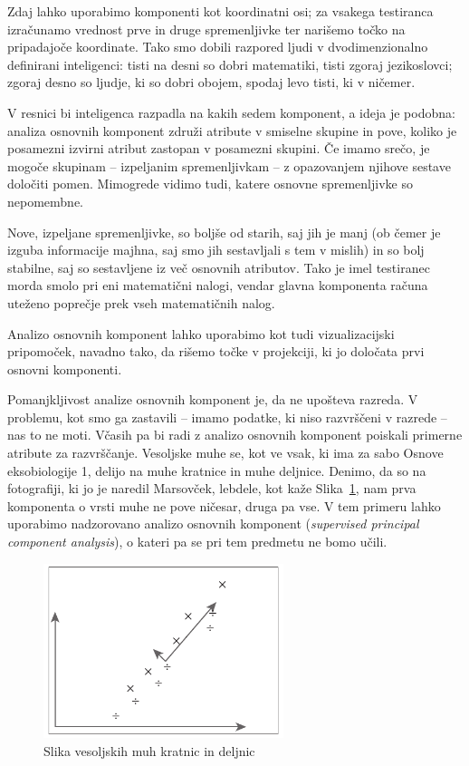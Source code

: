 Zdaj lahko uporabimo komponenti kot koordinatni osi; za vsakega testiranca izračunamo vrednost prve in druge spremenljivke ter narišemo točko na pripadajoče koordinate. Tako smo dobili razpored ljudi v dvodimenzionalno definirani inteligenci: tisti na desni so dobri matematiki, tisti zgoraj jezikoslovci; zgoraj desno so ljudje, ki so dobri obojem, spodaj levo tisti, ki v ničemer.

V resnici bi inteligenca razpadla na kakih sedem komponent, a ideja je podobna: analiza osnovnih komponent združi atribute v smiselne skupine in pove, koliko je posamezni izvirni atribut zastopan v posamezni skupini. Če imamo srečo, je mogoče skupinam -- izpeljanim spremenljivkam -- z opazovanjem njihove sestave določiti pomen. Mimogrede vidimo tudi, katere osnovne spremenljivke so nepomembne.

Nove, izpeljane spremenljivke, so boljše od starih, saj jih je manj (ob čemer je izguba informacije majhna, saj smo jih sestavljali s tem v mislih) in so bolj stabilne, saj so sestavljene iz več osnovnih atributov. Tako je imel testiranec morda smolo pri eni matematični nalogi, vendar glavna komponenta računa uteženo poprečje prek vseh matematičnih nalog.

Analizo osnovnih komponent lahko uporabimo kot tudi vizualizacijski pripomoček, navadno tako, da rišemo točke v projekciji, ki jo določata prvi osnovni komponenti.

Pomanjkljivost analize osnovnih komponent je, da ne upošteva razreda. V problemu, kot smo ga zastavili -- imamo podatke, ki niso razvrščeni v razrede -- nas to ne moti. Včasih pa bi radi z analizo osnovnih komponent poiskali primerne atribute za razvrščanje. Vesoljske muhe se, kot ve vsak, ki ima za sabo Osnove eksobiologije 1, delijo na muhe kratnice in muhe deljnice. Denimo, da so na fotografiji, ki jo je naredil Marsovček, lebdele, kot kaže Slika~\ref{f-muhe-nadzorovane}, nam prva komponenta o vrsti muhe ne pove ničesar, druga pa vse. V tem primeru lahko uporabimo nadzorovano analizo osnovnih komponent ({\em supervised principal component analysis}), o kateri pa se pri tem predmetu ne bomo učili.


\begin{figure}[tbp]
\begin{center}
\includegraphics[width=7cm]{slike/muhe-nadzorovane.pdf}
\caption{Slika vesoljskih muh kratnic in deljnic}
\label{f-muhe-nadzorovane}
\end{center}
\end{figure}


